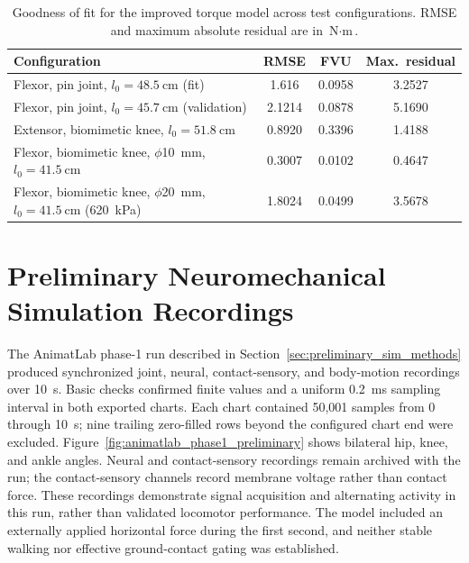 \begin{table}[htbp]
\caption{Goodness of fit for the improved torque model across test configurations. RMSE and maximum absolute residual are in $\text{N}\cdot\text{m}$.}
\label{tab:TorqueFit}
\begin{tabular}{@{}lccc@{}}
\toprule
\textbf{Configuration} & \textbf{RMSE} & \textbf{FVU} & \textbf{Max.\ residual} \\
\midrule
Flexor, pin joint, $l_{0}=\qty{48.5}{\cm}$ (fit) & 1.616 & 0.0958 & 3.2527 \\
Flexor, pin joint, $l_{0}=\qty{45.7}{\cm}$ (validation) & 2.1214 & 0.0878 & 5.1690 \\
Extensor, biomimetic knee, $l_{0}=\qty{51.8}{\cm}$ & 0.8920 & 0.3396 & 1.4188 \\
Flexor, biomimetic knee, $\phi$\qty{10}{\mm}, $l_{0}=\qty{41.5}{\cm}$ & 0.3007 & 0.0102 & 0.4647 \\
Flexor, biomimetic knee, $\phi$\qty{20}{\mm}, $l_{0}=\qty{41.5}{\cm}$ (\qty{620}{\kPa}) & 1.8024 & 0.0499 & 3.5678 \\
\bottomrule
\end{tabular}
\end{table}

\section{Preliminary Neuromechanical Simulation Recordings}\label{sec:preliminary_sim_results}

The AnimatLab phase-1 run described in Section~\ref{sec:preliminary_sim_methods} produced synchronized joint, neural, contact-sensory, and body-motion recordings over \qty{10}{\second}. Basic checks confirmed finite values and a uniform \qty{0.2}{\milli\second} sampling interval in both exported charts. Each chart contained 50,001 samples from 0 through \qty{10}{\second}; nine trailing zero-filled rows beyond the configured chart end were excluded. Figure~\ref{fig:animatlab_phase1_preliminary} shows bilateral hip, knee, and ankle angles. Neural and contact-sensory recordings remain archived with the run; the contact-sensory channels record membrane voltage rather than contact force. These recordings demonstrate signal acquisition and alternating activity in this run, rather than validated locomotor performance. The model included an externally applied horizontal force during the first second, and neither stable walking nor effective ground-contact gating was established.

